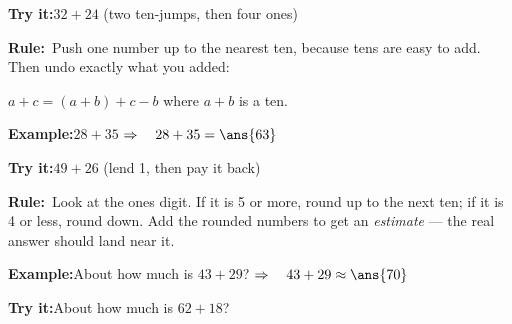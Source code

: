 \documentclass[12pt]{article}
\begin{document}
\begin{tryitbox}\textbf{Try it:}\quad $32 + 24$ (two ten-jumps, then four ones)\\[2pt]
\end{tryitbox}


\begin{formulabox}\textbf{Rule:}\ Push one number up to the nearest ten,
because tens are easy to add. Then undo exactly what you added:\par
\centerline{$a + c = (a + b) + c - b$ \qquad where $a + b$ is a ten.}
\end{formulabox}

\begin{examplebox}\textbf{Example:}\quad $28 + 35$
$\Rightarrow\quad 28 + 35 = \ans{63}$
\end{examplebox}

\begin{tryitbox}\textbf{Try it:}\quad $49 + 26$ (lend 1, then pay it back)\\[2pt]
\end{tryitbox}


\begin{formulabox}\textbf{Rule:}\ Look at the ones digit. If it is 5 or more,
round up to the next ten; if it is 4 or less, round down. Add the rounded
numbers to get an \emph{estimate} --- the real answer should land near it.
\end{formulabox}

\begin{examplebox}\textbf{Example:}\quad About how much is $43 + 29$?
$\Rightarrow\quad 43 + 29 \approx \ans{70}$
\end{examplebox}

\begin{tryitbox}\textbf{Try it:}\quad About how much is $62 + 18$?\\[2pt]
\end{tryitbox}
\end{document}
